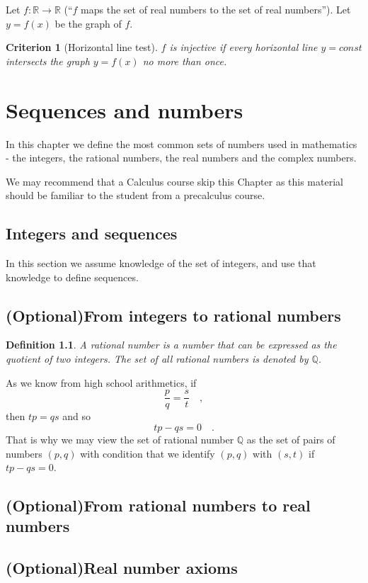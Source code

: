 \documentclass[12pt]{book}
\newtheorem{criterion}[theorem]{Criterion}
\newtheorem{definition}[theorem]{Definition}
\newcommand{\optionalMaterial}{\textbf{(Optional)}}
\begin{document}
Let $f: \mathbb R\to \mathbb R$ (``$f$ maps the set of real numbers to the set of real numbers''). Let $y=f(x)$ be the graph of $f$.
\begin{criterion}[Horizontal line test]
$f$ is injective if every horizontal line $y=const$ intersects the graph $y=f(x)$ no more than once.
\end{criterion}


\chapter{Sequences and numbers}
In this chapter we define the most common sets of numbers used in mathematics - the integers, the rational numbers, the real numbers and the complex numbers. 

We may recommend that a Calculus course skip this Chapter as this material should be familiar to the student from a precalculus course. 

\section{Integers and sequences}\label{secSequences}
In this section we assume knowledge of the set of integers, and use that knowledge to define sequences.
\section{ \optionalMaterial From integers to rational numbers }\label{secRationalNumbers}
\begin{definition}
A rational number is a number that can be expressed as the quotient of two integers. The set of all rational numbers is denoted by $\mathbb Q$.
\end{definition}
As we know from high school arithmetics, if \[\frac{p}{q}=\frac{s}{t}\quad ,\] 
then $tp=qs$ and so \[tp-qs=0\quad .\] 
That is why we may view the set of rational number $\mathbb Q $ as the set of pairs of numbers $(p,q)$ with condition that we identify $ (p,q)$ with $(s,t)$ if $tp-qs=0$.

\section{\optionalMaterial From rational numbers to real numbers}\label{secReals}



\section{\optionalMaterial Real number axioms}\label{secRealNumbersDef}
\end{document}
